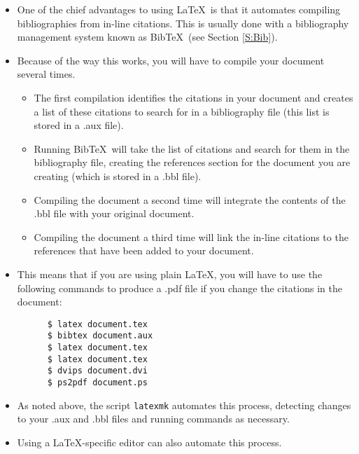 \documentclass[11pt, letterpaper]{article}
\begin{document}
    \begin{itemize}
      \item One of the chief advantages to using \LaTeX\ is that it automates compiling bibliographies from in-line citations. This is usually done with a bibliography management system known as Bib\TeX\ (see Section \ref{S:Bib}).
      
      \item Because of the way this works, you will have to compile your document several times.
      
	  \begin{itemize}
	  
	    \item The first compilation identifies the citations in your document and creates a list of these citations to search for in a bibliography file (this list is stored in a .aux file).
	    
	    \item Running Bib\TeX\ will take the list of citations and search for them in the bibliography file, creating the references section for the document you are creating (which is stored in a .bbl file).
	    
	    \item Compiling the document a second time will integrate the contents of the .bbl file with your original document.
	    
	    \item Compiling the document a third time will link the in-line citations to the references that have been added to your document.
	  
	  \end{itemize}
	  
	\item This means that if you are using plain \LaTeX, you will have to use the following commands to produce a .pdf file if you change the citations in the document:
	
	\begin{verbatim}
	  $ latex document.tex
	  $ bibtex document.aux
	  $ latex document.tex
	  $ latex document.tex
	  $ dvips document.dvi
	  $ ps2pdf document.ps
	\end{verbatim}
	
	\item As noted above, the script \verb+latexmk+ automates this process, detecting changes to your .aux and .bbl files and running commands as necessary.
	
	\item Using a \LaTeX-specific editor can also automate this process.

    \end{itemize}
\end{document}
